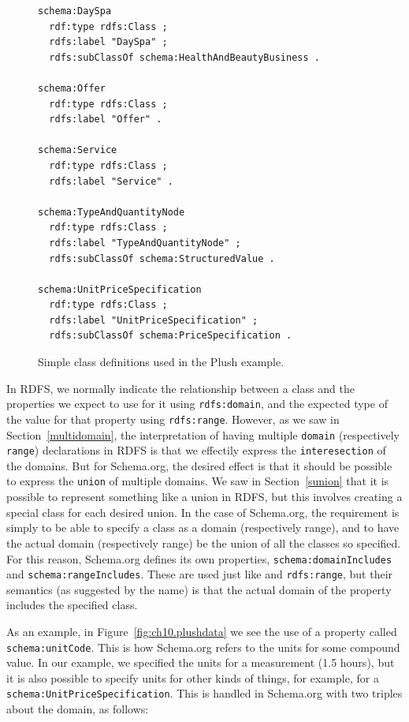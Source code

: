 \begin{figure}
\begin{lstlisting}
schema:DaySpa
  rdf:type rdfs:Class ;
  rdfs:label "DaySpa" ;
  rdfs:subClassOf schema:HealthAndBeautyBusiness .

schema:Offer
  rdf:type rdfs:Class ;
  rdfs:label "Offer" .
  
schema:Service
  rdf:type rdfs:Class ;
  rdfs:label "Service" .
  
schema:TypeAndQuantityNode
  rdf:type rdfs:Class ;
  rdfs:label "TypeAndQuantityNode" ;
  rdfs:subClassOf schema:StructuredValue .

schema:UnitPriceSpecification
  rdf:type rdfs:Class ;
  rdfs:label "UnitPriceSpecification" ;
  rdfs:subClassOf schema:PriceSpecification .
\end{lstlisting} 

    \caption{Simple class definitions used in the Plush example. }
    \label{fig:ch10.s.o.def}
\end{figure}

In RDFS, we normally indicate the relationship between a class and the properties
we expect to use for it using \texttt{rdfs:domain}, and the expected 
type of the value for that property using \texttt{rdfs:range}.  However, as we 
saw in Section~\ref{multidomain}, the interpretation of having multiple 
\texttt{domain} (respectively \texttt{range}) declarations in RDFS is that 
we effectily express the \texttt{interesection} of the domains.  But for 
Schema.org, the desired effect is that it should be possible to express the 
\texttt{union} of multiple domains.  We saw in Section~\ref{sunion} that it is 
possible to represent something like a union in RDFS, but this involves
creating a special class for each desired union.  In the case of Schema.org, 
the requirement is simply to be able to specify a class as a domain (respectively 
range), and to have the actual domain (respectively range) be the union of all 
the classes so specified.  For this reason, Schema.org defines its own 
properties, \texttt{schema:domainIncludes} and \texttt{schema:rangeIncludes}. 
These are used just like  and \texttt{rdfs:range}, but 
their semantics (as suggested by the name) is that the actual domain of 
the property includes the specified class. 

As an example, in Figure~\ref{fig:ch10.plushdata} we see the use of a property 
called \texttt{schema:unitCode}.  This is how Schema.org refers to the units
for some compound value.  In our example, we specified the units for a measurement
(1.5 hours), but it is also possible to specify units for other kinds of things, 
for example, for a \texttt{schema:UnitPriceSpecification}.  This is 
handled in Schema.org with two triples about the domain, as follows:

